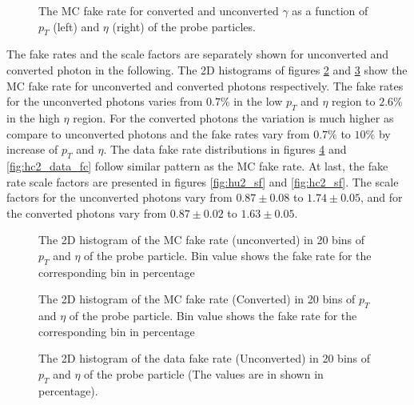 \begin{figure}[H]
\begin{center}
\scalebox{0.35}{}\scalebox{0.35}{}
\caption{The MC fake rate for converted and unconverted $\gamma$ as a function of $p_{T}$ (left) and $\eta$ (right) of the probe particles.}
\label{fig:mc_fc_conv}
\end{center}
\end{figure}

The fake rates and the scale factors are separately shown for unconverted and converted photon in the following. The 2D histograms of figures \ref{fig:hu2_mc_fc} and \ref{fig:hc2_mc_fc} show the MC fake rate for unconverted and converted photons respectively. The fake rates for the unconverted photons varies from $0.7\%$ in the low $p_{T}$ and $\eta$ region to $2.6\%$ in the high $\eta$ region. For the converted photons the variation is much higher as compare to unconverted photons and the fake rates vary from $0.7\%$ to $10\%$ by increase of $p_{T}$ and $\eta$. The data fake rate distributions in figures \ref{fig:hu2_data_fc} and \ref{fig:hc2_data_fc} follow similar pattern as the MC fake rate. At last, the fake rate scale factors are presented in figures \ref{fig:hu2_sf} and \ref{fig:hc2_sf}. The scale factors for the unconverted photons vary from $0.87\pm0.08$ to $1.74\pm0.05$, and for the converted photons vary from $0.87\pm0.02$ to $1.63\pm0.05$.

\begin{figure}[htbp]
\begin{center}
\scalebox{0.6}{}
\caption{The 2D histogram of the MC fake rate (unconverted) in 20 bins of $p_{T}$ and $\eta$ of the probe particle. Bin value shows the fake rate for the corresponding bin in percentage}
\label{fig:hu2_mc_fc}
\end{center}
\end{figure}

\begin{figure}[htbp]
\begin{center}
\scalebox{0.6}{}
\caption{The 2D histogram of the MC fake rate (Converted) in 20 bins of $p_{T}$ and $\eta$ of the probe particle. Bin value shows the fake rate for the corresponding bin in percentage}
\label{fig:hc2_mc_fc}
\end{center}
\end{figure}

\begin{figure}[htbp]
\begin{center}
\scalebox{0.6}{}
\caption{The 2D histogram of the data fake rate (Unconverted) in 20 bins of $p_{T}$ and $\eta$ of the probe particle (The values are in shown in percentage).}
\label{fig:hu2_data_fc}
\end{center}
\end{figure}

